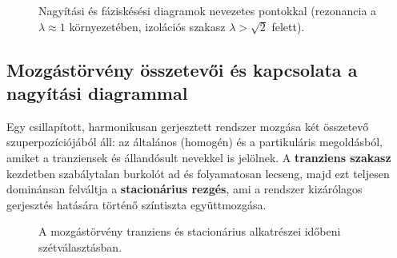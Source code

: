 \begin{figure}[H]
\begin{minipage}{0.48\textwidth}
    \end{minipage}
    \caption{Nagyítási és fáziskésési diagramok nevezetes pontokkal (rezonancia a $\lambda \approx 1$ környezetében, izolációs szakasz $\lambda>\sqrt{2}$ felett).}
\end{figure}

\newpage
\subsection*{Mozgástörvény összetevői és kapcsolata a nagyítási diagrammal}
Egy csillapított, harmonikusan gerjesztett rendszer mozgása két összetevő szuperpozíciójából áll: az általános (homogén) és a partikuláris megoldásból, amiket a tranziensek és állandósult nevekkel is jelölnek. A \textbf{tranziens szakasz} kezdetben szabálytalan burkolót ad és folyamatosan lecseng, majd ezt teljesen dominánsan felváltja a \textbf{stacionárius rezgés}, ami a rendszer kizárólagos gerjesztés hatására történő színtiszta együttmozgása.

\begin{figure}[H]
    \centering
    \caption{A mozgástörvény tranziens és stacionárius alkatrészei időbeni szétválasztásban.}
\end{figure}

